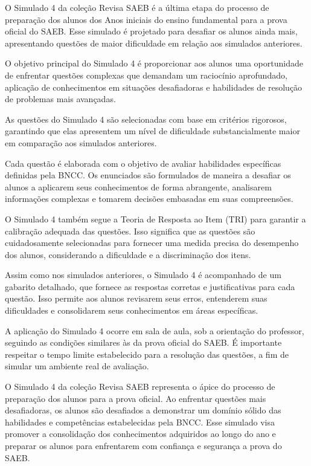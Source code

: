 O Simulado 4 da coleção Revisa SAEB é a última etapa do processo de preparação dos
alunos dos Anos iniciais do ensino fundamental para a prova oficial do
SAEB. Esse simulado é projetado para desafiar os alunos ainda mais,
apresentando questões de maior dificuldade em relação aos simulados
anteriores.

O objetivo principal do Simulado 4 é proporcionar aos alunos uma
oportunidade de enfrentar questões complexas que demandam um raciocínio
aprofundado, aplicação de conhecimentos em situações desafiadoras e
habilidades de resolução de problemas mais avançadas.

As questões do Simulado 4 são selecionadas com base em critérios
rigorosos, garantindo que elas apresentem um nível de dificuldade
substancialmente maior em comparação aos simulados anteriores.

Cada questão é elaborada com o objetivo de avaliar habilidades
específicas definidas pela BNCC. Os enunciados são formulados de maneira
a desafiar os alunos a aplicarem seus conhecimentos de forma abrangente,
analisarem informações complexas e tomarem decisões embasadas em suas
compreensões.

O Simulado 4 também segue a Teoria de Resposta ao Item (TRI) para
garantir a calibração adequada das questões. Isso significa que as
questões são cuidadosamente selecionadas para fornecer uma medida
precisa do desempenho dos alunos, considerando a dificuldade e a
discriminação dos itens.

Assim como nos simulados anteriores, o Simulado 4 é acompanhado de um
gabarito detalhado, que fornece as respostas corretas e justificativas
para cada questão. Isso permite aos alunos revisarem seus erros,
entenderem suas dificuldades e consolidarem seus conhecimentos em áreas
específicas.

A aplicação do Simulado 4 ocorre em sala de aula, sob a orientação do
professor, seguindo as condições similares às da prova oficial do SAEB.
É importante respeitar o tempo limite estabelecido para a resolução das
questões, a fim de simular um ambiente real de avaliação.

O Simulado 4 da coleção Revisa SAEB representa o ápice do processo de preparação dos
alunos para a prova oficial. Ao enfrentar questões mais desafiadoras, os
alunos são desafiados a demonstrar um domínio sólido das habilidades e
competências estabelecidas pela BNCC. Esse simulado visa promover a
consolidação dos conhecimentos adquiridos ao longo do ano e preparar os
alunos para enfrentarem com confiança e segurança a prova do SAEB.
